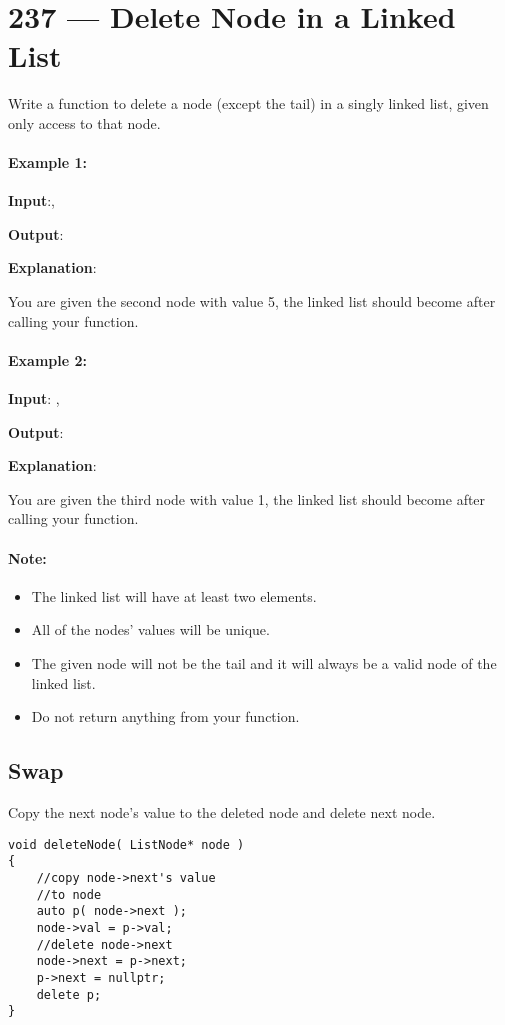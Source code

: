 \section{237 --- Delete Node in a Linked List}
Write a function to delete a node (except the tail) in a singly linked list, given only access to that node.

\paragraph{Example 1:}

\textbf{Input}:, 

\textbf{Output}: \fcj{[4,1,9]}

\textbf{Explanation}: 

You are given the second node with value 5, the linked list should become  after calling your function.

\paragraph{Example 2:}

\textbf{Input}: , 

\textbf{Output}: \fcj{[4,5,9]}

\textbf{Explanation}: 

You are given the third node with value 1, the linked list should become  after calling your function.
 

\paragraph{Note:}

\begin{itemize}
\item The linked list will have at least two elements.
\item All of the nodes' values will be unique.
\item The given node will not be the tail and it will always be a valid node of the linked list.
\item Do not return anything from your function.
\end{itemize}

\subsection{Swap}
Copy the next node's value to the deleted node and delete next node.

\setcounter{lstlisting}{0}
\begin{lstlisting}[style=customc, caption={Swap}]
void deleteNode( ListNode* node )
{
    //copy node->next's value
    //to node
    auto p( node->next );
    node->val = p->val;
    //delete node->next
    node->next = p->next;
    p->next = nullptr;
    delete p;
}
\end{lstlisting}